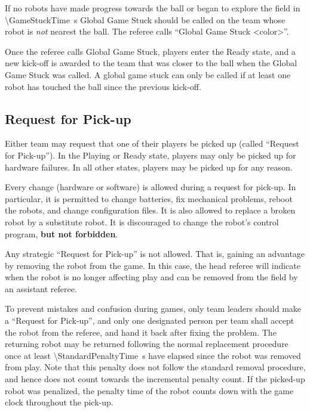 If no robots have made progress towards the ball or began to explore the field in \qty{\GameStuckTime}{\second} Global Game Stuck should be called on the team whose robot is \textit{not} nearest the ball.
The referee calls ``Global Game Stuck \textless color\textgreater''.

Once the referee calls Global Game Stuck, players enter the Ready state, and a new kick-off is awarded to the team that was closer to the ball when the Global Game Stuck was called. A global game stuck can only be called if at least one robot has touched the ball since the previous kick-off.

\subsection{Request for Pick-up}
\label{sec:request_for_pickup}

Either team may request that one of their players be picked up (called ``Request for Pick-up'').
In the Playing or Ready state, players may only be picked up for hardware failures.
In all other states, players may be picked up for any reason.

Every change (hardware or software) is allowed during a request for pick-up. In particular,
it is permitted to change batteries, fix mechanical problems, reboot the robots, and change configuration files.
It is also allowed to replace a broken robot by a substitute robot.
It is discouraged to change the robot's control program, \textbf{but not forbidden}.

Any strategic ``Request for Pick-up'' is not allowed.
That is, gaining an advantage by removing the robot from the game.
In this case, the head referee will indicate when the robot is no longer affecting play and can be removed from the field by an assistant referee.

To prevent mistakes and confusion during games, only team leaders should make a ``Request for Pick-up'', and only one designated person per team shall accept the robot from the referee, and hand it back after fixing the problem.
The returning robot may be returned following the normal replacement procedure once at least \qty{\StandardPenaltyTime}{\second} have elapsed since the robot was removed from play.
Note that this penalty does not follow the standard removal procedure, and hence does not count towards the incremental penalty count.
If the picked-up robot was penalized, the penalty time of the robot counts down with the game clock throughout the pick-up.

